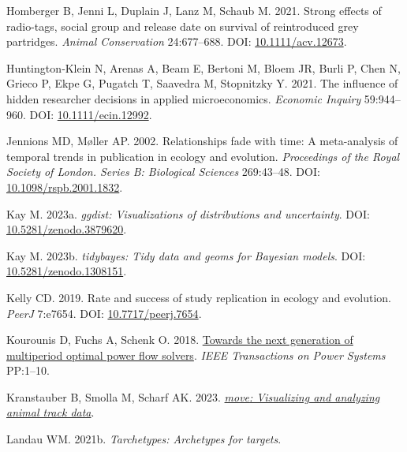\documentclass[10pt,a4paper]{article}
\newlength{\cslhangindent}
\newlength{\cslentryspacingunit} %
\newenvironment{CSLReferences}[2] %
 {%
  \setlength{\parindent}{0pt}
  \ifodd #1
  \let\oldpar\par
  \def\par{\hangindent=\cslhangindent\oldpar}
  \fi
  \setlength{\parskip}{#2\cslentryspacingunit}
 }%
 {}
\begin{document}
\begin{CSLReferences}{1}{0}
\leavevmode{}%
Homberger B, Jenni L, Duplain J, Lanz M, Schaub M. 2021. Strong effects of radio-tags, social group and release date on survival of reintroduced grey partridges. \emph{Animal Conservation} 24:677--688. DOI: \href{https://doi.org/10.1111/acv.12673}{10.1111/acv.12673}.

\leavevmode{}%
Huntington‐Klein N, Arenas A, Beam E, Bertoni M, Bloem JR, Burli P, Chen N, Grieco P, Ekpe G, Pugatch T, Saavedra M, Stopnitzky Y. 2021. The influence of hidden researcher decisions in applied microeconomics. \emph{Economic Inquiry} 59:944--960. DOI: \href{https://doi.org/10.1111/ecin.12992}{10.1111/ecin.12992}.

\leavevmode{}%
Jennions MD, Møller AP. 2002. Relationships fade with time: A meta-analysis of temporal trends in publication in ecology and evolution. \emph{Proceedings of the Royal Society of London. Series B: Biological Sciences} 269:43--48. DOI: \href{https://doi.org/10.1098/rspb.2001.1832}{10.1098/rspb.2001.1832}.

\leavevmode{}%
Kay M. 2023a. \emph{{ggdist}: Visualizations of distributions and uncertainty}. DOI: \href{https://doi.org/10.5281/zenodo.3879620}{10.5281/zenodo.3879620}.

\leavevmode{}%
Kay M. 2023b. \emph{{tidybayes}: Tidy data and geoms for {Bayesian} models}. DOI: \href{https://doi.org/10.5281/zenodo.1308151}{10.5281/zenodo.1308151}.

\leavevmode{}%
Kelly CD. 2019. Rate and success of study replication in ecology and evolution. \emph{PeerJ} 7:e7654. DOI: \href{https://doi.org/10.7717/peerj.7654}{10.7717/peerj.7654}.

\leavevmode{}%
Kourounis D, Fuchs A, Schenk O. 2018. \href{https://doi.org/10.1109/TPWRS.2017.2789187}{Towards the next generation of multiperiod optimal power flow solvers}. \emph{IEEE Transactions on Power Systems} PP:1--10.

\leavevmode{}%
Kranstauber B, Smolla M, Scharf AK. 2023. \emph{\href{https://CRAN.R-project.org/package=move}{{move}: Visualizing and analyzing animal track data}}.

\leavevmode{}%
Landau WM. 2021b. \emph{Tarchetypes: Archetypes for targets}.


\end{CSLReferences}
\end{document}

